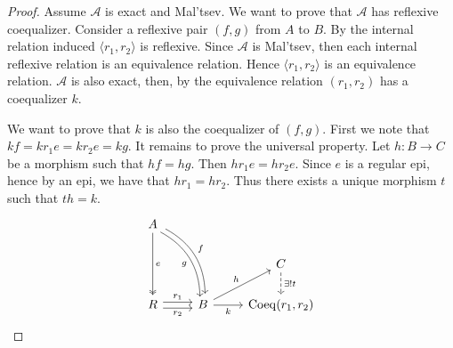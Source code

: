 \begin{subbox}{}
    \begin{proof}
        Assume $\mathcal{A}$ is exact and Mal'tsev. We want to prove that $\mathcal{A}$ has reflexive coequalizer. Consider a reflexive pair $(f,g)$ from $A$ to $B$. By  the internal relation induced $\langle r_1,r_2 \rangle$ is reflexive. Since $\mathcal{A}$ is Mal'tsev, then each internal reflexive relation is an equivalence relation. Hence $\langle r_1,r_2 \rangle$ is an equivalence relation. $\mathcal{A}$ is also exact, then, by  the equivalence relation $(r_1,r_2)$ has a coequalizer $k$.
        
        We want to prove that $k$ is also the coequalizer of $(f,g)$. First we note that $kf=kr_1e=kr_2e=kg$. It remains to prove the universal property. Let $h:B \to C$ be a morphism such that $hf=hg$. Then $hr_1e=hr_2e$. Since $e$ is a regular epi, hence by  an epi, we have that $hr_1=hr_2$. Thus there exists a unique morphism $t$ such that $th=k$.
        \[
    \begin{tikzcd}
        A \arrow[dd, "e", two heads] \arrow[rdd, "f", bend left, shift left] \arrow[rdd, "g"', bend left, shift right] &                                   &                                    \\
                                                                                                                       &                                   & C \arrow[d, "\exists ! t", dashed] \\
        R \arrow[r, "r_2"', shift right] \arrow[r, "r_1", shift left]                                                  & B \arrow[r, "k"'] \arrow[ru, "h"] & {\mathrm{Coeq}(r_1,r_2)}          
        \end{tikzcd}
        \]
    \end{proof}    
\end{subbox}

